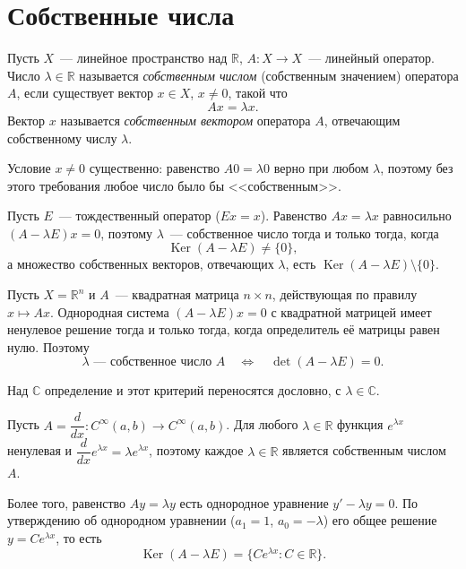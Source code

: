 \documentclass[12pt]{article}
\begin{document}
	\section{Собственные числа}

	\begin{definition}
		Пусть $X$~--- линейное пространство над $\mathbb{R}$, $A: X \rightarrow X$~--- линейный оператор. Число $\lambda \in \mathbb{R}$ называется \emph{собственным числом} (собственным значением) оператора $A$, если существует вектор $x \in X$, $x \ne 0$, такой что
		\[
			Ax = \lambda x.
		\]
		Вектор $x$ называется \emph{собственным вектором} оператора $A$, отвечающим собственному числу $\lambda$.
	\end{definition}

	\begin{note}
		Условие $x \ne 0$ существенно: равенство $A0 = \lambda 0$ верно при любом $\lambda$, поэтому без этого требования любое число было бы <<собственным>>.

		Пусть $E$~--- тождественный оператор ($Ex = x$). Равенство $Ax = \lambda x$ равносильно $(A - \lambda E)x = 0$, поэтому $\lambda$~--- собственное число тогда и только тогда, когда
		\[
			\operatorname{Ker}(A - \lambda E) \ne \{0\},
		\]
		а множество собственных векторов, отвечающих $\lambda$, есть $\operatorname{Ker}(A - \lambda E) \setminus \{0\}$.

		Пусть $X = \mathbb{R}^n$ и $A$~--- квадратная матрица $n \times n$, действующая по правилу $x \mapsto Ax$. Однородная система $(A - \lambda E)x = 0$ с квадратной матрицей имеет ненулевое решение тогда и только тогда, когда определитель её матрицы равен нулю. Поэтому
		\[
			\lambda \text{~--- собственное число } A \quad \Longleftrightarrow \quad \det(A - \lambda E) = 0.
		\]

		Над $\mathbb{C}$ определение и этот критерий переносятся дословно, с $\lambda \in \mathbb{C}$.
	\end{note}

	\begin{example}
		Пусть $A = \dfrac{d}{dx}: C^\infty(a, b) \rightarrow C^\infty(a, b)$. Для любого $\lambda \in \mathbb{R}$ функция $e^{\lambda x}$ ненулевая и $\dfrac{d}{dx} e^{\lambda x} = \lambda e^{\lambda x}$, поэтому каждое $\lambda \in \mathbb{R}$ является собственным числом $A$.

		Более того, равенство $Ay = \lambda y$ есть однородное уравнение $y' - \lambda y = 0$. По утверждению об однородном уравнении ($a_1 = 1$, $a_0 = -\lambda$) его общее решение $y = C e^{\lambda x}$, то есть
		\[
			\operatorname{Ker}(A - \lambda E) = \{ C e^{\lambda x} : C \in \mathbb{R} \}.
		\]
	\end{example}
\end{document}

